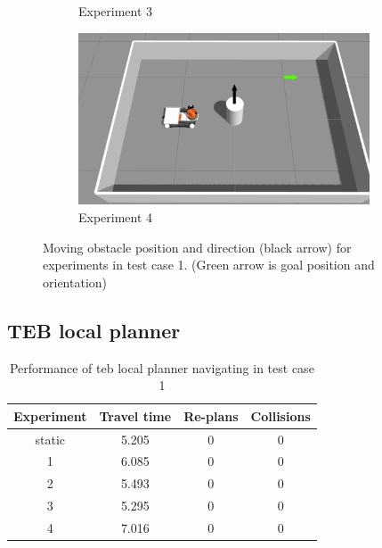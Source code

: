 \begin{figure}[H]
\begin{subfigure}[b]{0.50\linewidth}
        \caption{Experiment 3}
    \end{subfigure}%
    \begin{subfigure}[b]{0.50\linewidth}
        \centering
        \includegraphics[width=0.95\textwidth]{images/test_case_1/exp4.png}
        \caption{Experiment 4}
    \end{subfigure}%
    \caption{Moving obstacle position and direction (black arrow) for experiments in test case 1.
    (Green arrow is goal position and orientation)}\label{fig:test_case_1_experiment_start}
\end{figure}

\subsection{TEB local planner}%
\label{sub:eval_teb_local_planner}

\begin{table}[H]
    \centering
    \begin{tabular}{cccc}
        \textbf{Experiment} & \textbf{Travel time} & \textbf{Re-plans} & \textbf{Collisions} \\\toprule
        static & 5.205 & 0 & 0 \\
             1 & 6.085 & 0 & 0 \\
             2 & 5.493 & 0 & 0 \\
             3 & 5.295 & 0 & 0 \\
             4 & 7.016 & 0 & 0 \\
    \end{tabular}
    \caption{Performance of teb local planner navigating in test case 1}\label{tab:perfomance_teb_test_case_1}
\end{table}


